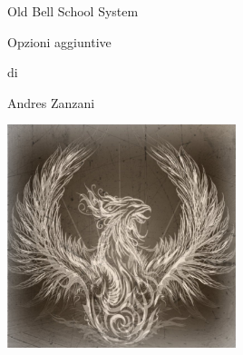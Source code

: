 \documentclass[a4paper,twoside,openany]{book}
\begin{document}
\def \versione {0.99} \fontsize{10}{12}\selectfont


{\Huge \begin{center} Old Bell School System \end{center}}

\bigskip

\begin{center}{\LARGE Opzioni aggiuntive}\\ \end{center}

\begin{center}di \end{center}

{\LARGE \begin{center} Andres Zanzani \end{center}}

\vspace{2cm}

\begin{center}
\includegraphics[keepaspectratio,width=0.50\textwidth]{immagini/copertina_old_scratch.png}
\end{center}

\vfill
\end{document}
